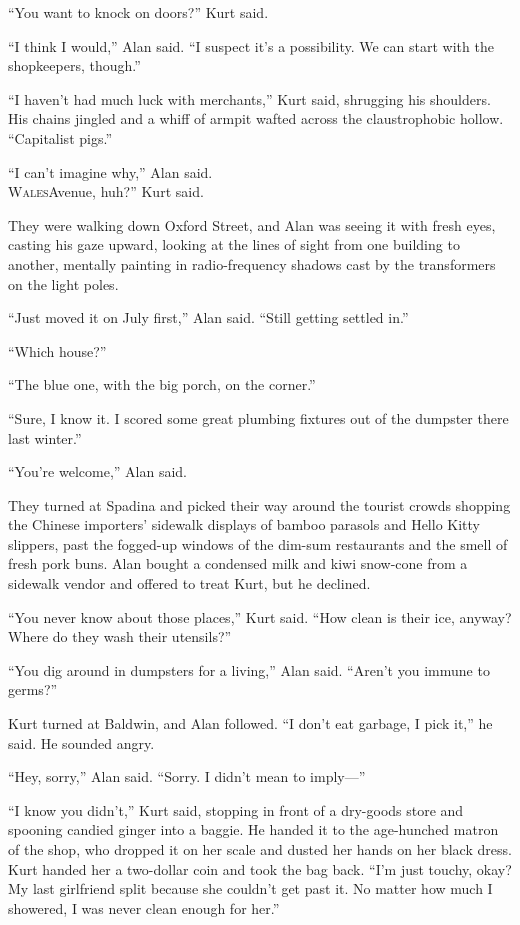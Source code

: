 ``You want to knock on doors?'' Kurt said.

``I think I would,'' Alan said.  ``I suspect it's a possibility.  We
can start with the shopkeepers, though.''

``I haven't had much luck with merchants,'' Kurt said, shrugging his
shoulders.  His chains jingled and a whiff of armpit wafted across the
claustrophobic hollow.  ``Capitalist pigs.''

``I can't imagine why,'' Alan said.
\\
\lettrine[lines=3, lhang=.5, nindent=0pt, findent=2pt]{W}{ales}Avenue, huh?'' Kurt said.

They were walking down Oxford Street, and Alan was seeing it with
fresh eyes, casting his gaze upward, looking at the lines of sight
from one building to another, mentally painting in radio-frequency
shadows cast by the transformers on the light poles.

``Just moved it on July first,'' Alan said.  ``Still getting settled
in.''

``Which house?''

``The blue one, with the big porch, on the corner.''

``Sure, I know it.  I scored some great plumbing fixtures out of the
dumpster there last winter.''

``You're welcome,'' Alan said.

They turned at Spadina and picked their way around the tourist crowds
shopping the Chinese importers' sidewalk displays of bamboo parasols
and Hello Kitty slippers, past the fogged-up windows of the dim-sum
restaurants and the smell of fresh pork buns.  Alan bought a condensed
milk and kiwi snow-cone from a sidewalk vendor and offered to treat
Kurt, but he declined.

``You never know about those places,'' Kurt said.  ``How clean is
their ice, anyway?  Where do they wash their utensils?''

``You dig around in dumpsters for a living,'' Alan said.  ``Aren't you
immune to germs?''

Kurt turned at Baldwin, and Alan followed.  ``I don't eat garbage, I
pick it,'' he said.  He sounded angry.

``Hey, sorry,'' Alan said.  ``Sorry.  I didn't mean to imply---''

``I know you didn't,'' Kurt said, stopping in front of a dry-goods
store and spooning candied ginger into a baggie.  He handed it to the
age-hunched matron of the shop, who dropped it on her scale and dusted
her hands on her black dress.  Kurt handed her a two-dollar coin and
took the bag back.  ``I'm just touchy, okay?  My last girlfriend split
because she couldn't get past it.  No matter how much I showered, I
was never clean enough for her.''

